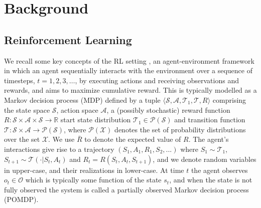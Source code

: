 \documentclass{article}
\begin{document}

\section{Background}

\subsection{Reinforcement Learning}

We recall some key concepts of the RL setting \citep{SB98}, an agent-environment framework \citep{RN10} in which an agent sequentially interacts with the environment over a sequence of timesteps, $t=1,2,3,\hdots $, by executing actions and receiving observations and rewards, and aims to maximize cumulative reward. This is typically modelled as a Markov decision process (MDP) \citep[e.g.][]{puterman} defined by a tuple $ \langle \mathcal{S,A},\mathcal{T}_1,\mathcal{T},R \rangle$ comprising the state space $\mathcal{S}$, action space $\mathcal{A}$, a (possibly stochastic) reward function $R : \mathcal{S \times A\times S }\to \mathbb{R}$ start state distribution $\mathcal{T}_1 \in \mathcal{P(S)}$ and transition function $\mathcal{T}:\mathcal{S\times A} \rightarrow \mathcal{P(S)}$, where $\mathcal{P(X)}$ denotes the set of probability distributions over the set $\mathcal{X}$. We use $\bar{R}$ to denote the expected value of $R$. The agent's interactions give rise to a trajectory $(S_1,A_1,R_1,S_2,...)$ where $S_{1}\sim \mathcal{T}_1$, $S_{t+1}\sim \mathcal{T}(\cdot|S_t,A_t)$ and $R_t = R(S_t,A_t,S_{t+1})$, and we denote random variables in upper-case, and their realizations in lower-case. At time $t$ the agent observes $ o_t\in\mathcal{O} $ which is typically some function of the state $s_t$, and when the state is not fully observed the system is called a partially observed Markov decision process (POMDP).
\end{document}
